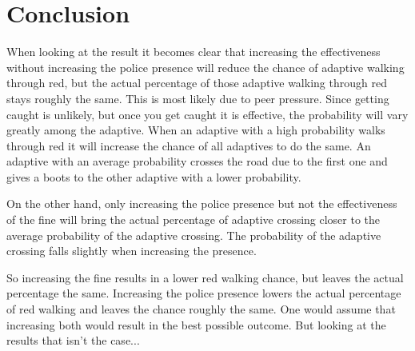 \documentclass[a4paper]{article}
\begin{document}
\clearpage

\section{Conclusion}
When looking at the result it becomes clear that increasing the effectiveness without increasing the police presence will reduce the chance of adaptive walking through red, but the actual percentage of those adaptive walking through red stays roughly the same. This is most likely due to peer pressure. Since getting caught is unlikely, but once you get caught it is effective, the probability will vary greatly among the adaptive. When an adaptive with a high probability walks through red it will increase the chance of all adaptives to do the same. An adaptive with an average probability crosses the road due to the first one and gives a boots to the other adaptive with a lower probability.

On the other hand, only increasing the police presence but not the effectiveness of the fine will bring the actual percentage of adaptive crossing closer to the average probability of the adaptive crossing. The probability of the adaptive crossing falls slightly when increasing the presence.

So increasing the fine results in a lower red walking chance, but leaves the actual percentage the same. Increasing the police presence lowers the actual percentage of red walking and leaves the chance roughly the same. One would assume that increasing both would result in the best possible outcome. But looking at the results that isn't the case...

\clearpage

\begin{thebibliography}{3}


\end{thebibliography}
\end{document}

